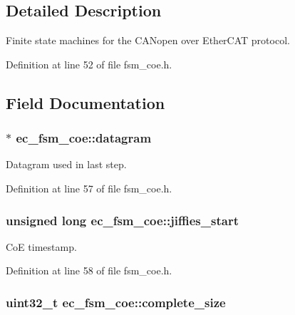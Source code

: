 \subsection{Detailed Description}
Finite state machines for the C\-A\-Nopen over Ether\-C\-A\-T protocol. 

Definition at line 52 of file fsm\-\_\-coe.\-h.



\subsection{Field Documentation}
\subsubsection[{datagram}]{$\ast$ ec\-\_\-fsm\-\_\-coe\-::datagram}\label{structec__fsm__coe_a1de20f618cb8600ef37e05cd909ea4cf}


Datagram used in last step. 



Definition at line 57 of file fsm\-\_\-coe.\-h.

\subsubsection[{jiffies\-\_\-start}]{\setlength{\rightskip}{0pt plus 5cm}unsigned long ec\-\_\-fsm\-\_\-coe\-::jiffies\-\_\-start}\label{structec__fsm__coe_acae779843d2dde4e1a02f4781d259d46}


Co\-E timestamp. 



Definition at line 58 of file fsm\-\_\-coe.\-h.

\subsubsection[{complete\-\_\-size}]{\setlength{\rightskip}{0pt plus 5cm}uint32\-\_\-t ec\-\_\-fsm\-\_\-coe\-::complete\-\_\-size}\label{structec__fsm__coe_ac87498148a6733460b858339b554f0ce}



